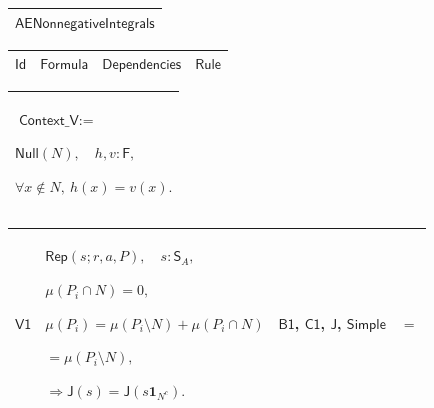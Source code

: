 \documentclass[11pt]{amsart}
\renewcommand{\arraystretch}{1.4}
\newlength{\FTCOneColumnBody}
\newlength{\FTCFourColumnBody}
\begin{document}
{\centering
\renewcommand{\arraystretch}{1.4}
\par\setlength{\parskip}{0pt}\nointerlineskip
\noindent
\begin{tabular}{|@{}>{\centering\arraybackslash}m{\FTCOneColumnBody}|}\hline
$\displaystyle \textsf{AENonnegativeIntegrals}$\\ \hline
\end{tabular}%
\par\setlength{\parskip}{0pt}\nointerlineskip
\noindent
\begin{tabular}{|@{}>{\centering\arraybackslash}m{0.078431\FTCFourColumnBody}|>{\centering\arraybackslash}m{0.535947\FTCFourColumnBody}|>{\centering\arraybackslash}m{0.281045\FTCFourColumnBody}|>{\centering\arraybackslash}m{0.104575\FTCFourColumnBody}|}\hline
$\displaystyle \textsf{Id}$ & $\displaystyle \textsf{Formula}$ & $\displaystyle \textsf{Dependencies}$ & $\displaystyle \textsf{Rule}$\\ \hline
\end{tabular}%
\par\setlength{\parskip}{0pt}\nointerlineskip
\noindent
\begin{tabular}{|@{}>{\centering\arraybackslash}m{\FTCOneColumnBody}|}\hline
$\displaystyle \textsf{Context\_V}:=$\par
$\displaystyle \textsf{Null}(N),\quad h,v:\textsf{F},$\par
$\displaystyle \forall x\notin N,\ h(x)=v(x).$\\ \hline
\end{tabular}%
\par\setlength{\parskip}{0pt}\nointerlineskip
\noindent
\begin{tabular}{|@{}>{\centering\arraybackslash}m{0.078431\FTCFourColumnBody}|>{\centering\arraybackslash}m{0.535947\FTCFourColumnBody}|>{\centering\arraybackslash}m{0.281045\FTCFourColumnBody}|>{\centering\arraybackslash}m{0.104575\FTCFourColumnBody}|}\hline
\hypertarget{dct:V1}{$\displaystyle \textsf{V1}$} & $\displaystyle \textsf{Rep}(s;r,a,P),\quad s:\textsf{S}_A,$\par
$\displaystyle \mu(P_i\cap N)=0,$\par
$\displaystyle \mu(P_i)=\mu(P_i\setminus N)+\mu(P_i\cap N)$\par
$\displaystyle {}=\mu(P_i\setminus N),$\par
$\displaystyle \Rightarrow\textsf{J}(s)=\textsf{J}(s\mathbf1_{N^c}).$ & \hyperlink{dct:B1}{$\displaystyle \textsf{B1}$}, \hyperlink{proof:C1}{$\displaystyle \textsf{C1}$}, \hyperlink{def:J}{$\displaystyle \textsf{J}$}, \hyperlink{lem:Simple}{$\displaystyle \textsf{Simple}$} & $\displaystyle =$\\ \hline

\end{tabular}}
\end{document}
